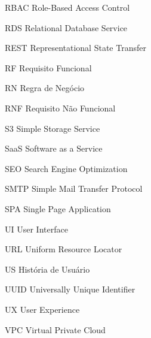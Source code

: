\begin{siglas}
  \item[RBAC] Role-Based Access Control
  \item[RDS] Relational Database Service
  \item[REST] Representational State Transfer
  \item[RF] Requisito Funcional
  \item[RN] Regra de Negócio
  \item[RNF] Requisito Não Funcional
  \item[S3] Simple Storage Service
  \item[SaaS] Software as a Service
  \item[SEO] Search Engine Optimization
  \item[SMTP] Simple Mail Transfer Protocol
  \item[SPA] Single Page Application
  \item[UI] User Interface
  \item[URL] Uniform Resource Locator
  \item[US] História de Usuário
  \item[UUID] Universally Unique Identifier
  \item[UX] User Experience
  \item[VPC] Virtual Private Cloud
\end{siglas}